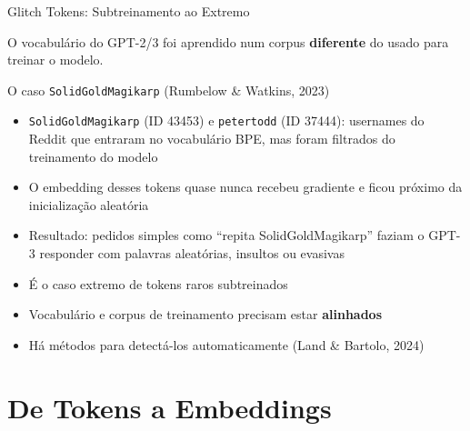 \documentclass[aspectratio=169,xcolor=dvipsnames]{beamer}
\begin{document}
\begin{frame}{Glitch Tokens: Subtreinamento ao Extremo}

O vocabulário do GPT-2/3 foi aprendido num corpus \textbf{diferente} do usado para treinar o modelo.

\vspace{2pt}

\begin{alertblock}{O caso \texttt{SolidGoldMagikarp} (Rumbelow \& Watkins, 2023)}
\begin{itemize}
    \item \texttt{\textvisiblespace SolidGoldMagikarp} (ID 43453) e \texttt{\textvisiblespace petertodd} (ID 37444): usernames do Reddit que entraram no vocabulário BPE, mas foram filtrados do treinamento do modelo
    \item O embedding desses tokens quase nunca recebeu gradiente e ficou próximo da inicialização aleatória
    \item Resultado: pedidos simples como ``repita SolidGoldMagikarp'' faziam o GPT-3 responder com palavras aleatórias, insultos ou evasivas
\end{itemize}
\end{alertblock}

\vspace{2pt}

\begin{itemize}
    \item É o caso extremo de tokens raros subtreinados
    \item Vocabulário e corpus de treinamento precisam estar \textbf{alinhados}
    \item Há métodos para detectá-los automaticamente (Land \& Bartolo, 2024)
\end{itemize}

\end{frame}

\section{De Tokens a Embeddings}
\end{document}
